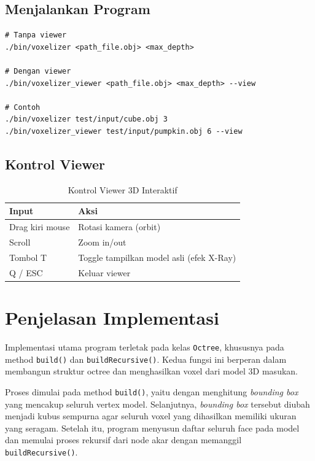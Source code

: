 \documentclass[12pt, a4paper]{report}
\begin{document}
\subsection{Menjalankan Program}

\begin{lstlisting}[style=pseudocode, numbers=none,
  caption={Cara menjalankan program}]
# Tanpa viewer
./bin/voxelizer <path_file.obj> <max_depth>

# Dengan viewer
./bin/voxelizer_viewer <path_file.obj> <max_depth> --view

# Contoh
./bin/voxelizer test/input/cube.obj 3
./bin/voxelizer_viewer test/input/pumpkin.obj 6 --view
\end{lstlisting}

\subsection{Kontrol Viewer}

\begin{table}[H]
  \centering
  \caption{Kontrol Viewer 3D Interaktif}
  \label{tab:viewer}
  \begin{tabular}{ll}
    \toprule
    \textbf{Input} & \textbf{Aksi} \\
    \midrule
    Drag kiri mouse & Rotasi kamera (orbit) \\
    Scroll         & Zoom in/out \\
    Tombol T        & Toggle tampilkan model asli (efek X-Ray) \\
    Q / ESC         & Keluar viewer \\
    \bottomrule
  \end{tabular}
\end{table}

\section{Penjelasan Implementasi}

Implementasi utama program terletak pada kelas \texttt{Octree},
khususnya pada method \texttt{build()} dan \texttt{buildRecursive()}.
Kedua fungsi ini berperan dalam membangun struktur octree dan menghasilkan
voxel dari model 3D masukan.

Proses dimulai pada method \texttt{build()}, yaitu dengan menghitung
\textit{bounding box} yang mencakup seluruh vertex model. Selanjutnya,
\textit{bounding box} tersebut diubah menjadi kubus sempurna agar seluruh
voxel yang dihasilkan memiliki ukuran yang seragam. Setelah itu, program
menyusun daftar seluruh face pada model dan memulai proses rekursif dari
node akar dengan memanggil \texttt{buildRecursive()}.
\end{document}
